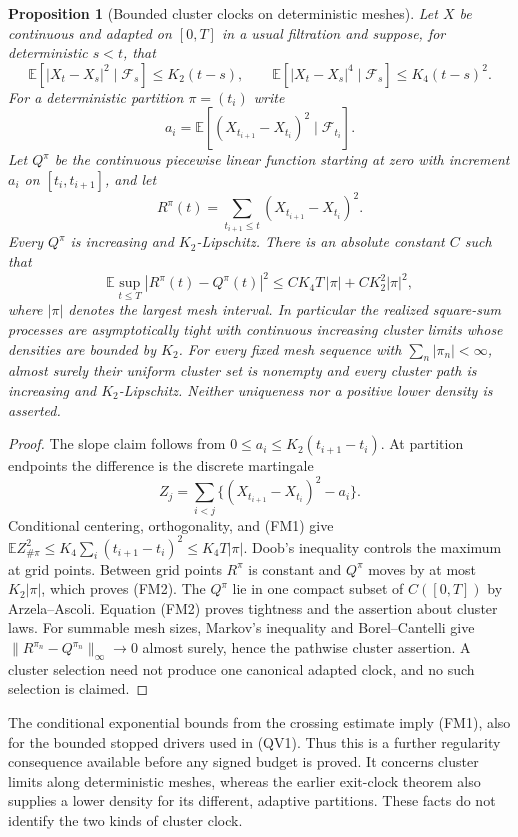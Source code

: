 \documentclass[11pt]{article}
\newtheorem{proposition}[theorem]{Proposition}
\theoremstyle{definition}\newtheorem{definition}[theorem]{Definition}
\theoremstyle{remark}\newtheorem{remark}[theorem]{Remark}
\begin{document}
\begin{proposition}[Bounded cluster clocks on deterministic meshes]
\label{prop:finite-mesh-square-clocks}
Let $X$ be continuous and adapted on $[0,T]$ in a usual filtration and
suppose, for deterministic $s<t$, that
\[
 \mathbb E[|X_t-X_s|^2\mid\mathcal F_s]\le K_2(t-s),\qquad
 \mathbb E[|X_t-X_s|^4\mid\mathcal F_s]\le K_4(t-s)^2.
 \tag{FM1}
\]
For a deterministic partition $\pi=(t_i)$ write
\[
 a_i=\mathbb E[(X_{t_{i+1}}-X_{t_i})^2\mid\mathcal F_{t_i}].
\]
Let $Q^\pi$ be the continuous piecewise linear function starting at
zero with increment $a_i$ on $[t_i,t_{i+1}]$, and let
\[
 R^\pi(t)=\sum_{t_{i+1}\le t}(X_{t_{i+1}}-X_{t_i})^2.
\]
Every $Q^\pi$ is increasing and $K_2$-Lipschitz. There is an absolute
constant $C$ such that
\[
 \mathbb E\sup_{t\le T}|R^\pi(t)-Q^\pi(t)|^2
 \le C K_4T\,|\pi|+C K_2^2|\pi|^2,
 \tag{FM2}
\]
where $|\pi|$ denotes the largest mesh interval. In particular the
realized square-sum processes are asymptotically tight with continuous
increasing cluster limits whose densities are bounded by $K_2$.
For every fixed mesh sequence with $\sum_n|\pi_n|<\infty$, almost
surely their uniform cluster set is nonempty and every cluster path
is increasing and $K_2$-Lipschitz.
Neither uniqueness nor a positive lower density is asserted.
\end{proposition}
\begin{proof}
The slope claim follows from $0\le a_i\le K_2(t_{i+1}-t_i)$.
At partition endpoints the difference is the discrete martingale
\[
 Z_j=\sum_{i<j}\{(X_{t_{i+1}}-X_{t_i})^2-a_i\}.
\]
Conditional centering, orthogonality, and (FM1) give
$\mathbb EZ_{\#\pi}^2\le K_4\sum_i(t_{i+1}-t_i)^2
\le K_4T|\pi|$.
Doob's inequality controls the maximum at grid points. Between grid
points $R^\pi$ is constant and $Q^\pi$ moves by at most $K_2|\pi|$,
which proves (FM2). The $Q^\pi$ lie in one compact subset of
$C([0,T])$ by Arzela--Ascoli. Equation (FM2) proves tightness and
the assertion about cluster laws. For summable mesh sizes,
Markov's inequality and Borel--Cantelli give
$\|R^{\pi_n}-Q^{\pi_n}\|_\infty\to0$ almost surely, hence the
pathwise cluster assertion. A cluster selection need not produce
one canonical adapted clock, and no such selection is claimed.
\end{proof}

The conditional exponential bounds from the crossing estimate imply
(FM1), also for the bounded stopped drivers used in (QV1). Thus this
is a further regularity consequence available before any signed
budget is proved. It concerns cluster limits along deterministic
meshes, whereas the earlier exit-clock theorem also supplies a lower
density for its different, adaptive partitions. These facts do not
identify the two kinds of cluster clock.
\end{document}
